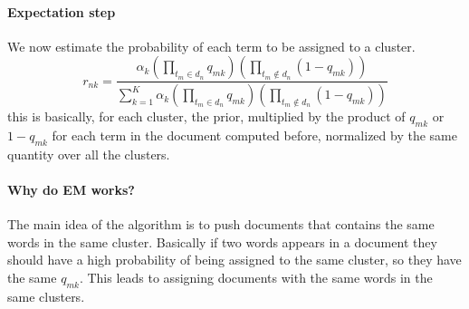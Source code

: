 \paragraph{Expectation step}
We now estimate the probability of each term to be assigned to a cluster.
$$r_{nk} = \frac{\alpha_k(\prod_{t_m \in d_n}q_{mk})(\prod_{t_m \notin d_n}(1-q_{mk}))}
{\sum_{k=1}^K\alpha_k(\prod_{t_m \in d_n}q_{mk})(\prod_{t_m \notin d_n}(1-q_{mk}))}$$
this is basically, for each cluster, the prior, multiplied by the product of $q_{mk}$ or $1- q_{mk}$ for each 
term in the document
computed before, 
normalized by the same quantity over all the clusters.

\paragraph{Why do EM works?}
The main idea of the algorithm is to push documents that contains the same 
words in the same cluster. Basically if two words appears in a document 
they should have a high probability of being assigned to the same cluster, 
so they have the same $q_{mk}$. This leads to assigning documents with the 
same words in the same clusters.
